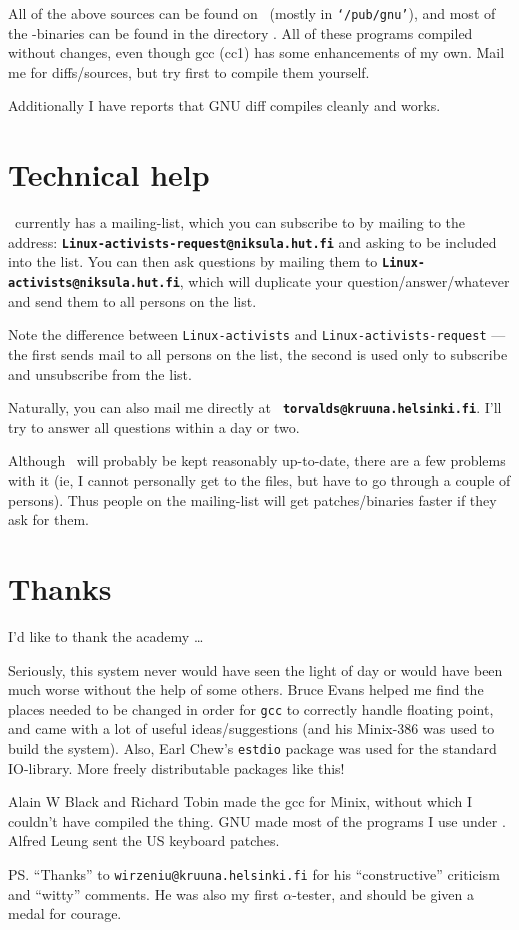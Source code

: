 All of the above sources can be found on \nic\ (mostly in
{\tt`/pub/gnu'}), and most of the \Linux-binaries can be found in the
directory \dir. All of these programs compiled without changes, even
though gcc (cc1) has some enhancements of my own. Mail me for
diffs/sources, but try first to compile them yourself.

Additionally I have reports that GNU diff compiles cleanly and works.

\section{Technical help}

\Linux\ currently has a mailing-list, which you can subscribe to by
mailing to the address: {\tt\bf Linux-activists-request@niksula.hut.fi}
and asking to be included into the list.  You can then ask questions by
mailing them to {\tt\bf Linux-activists@niksula.hut.fi}, which will
duplicate your question/answer/whatever and send them to all persons on
the list. 

Note the difference between {\tt Linux-activists} and
{\tt Linux-activists-request} --- the first sends mail to all persons on
the list, the second is used only to subscribe and unsubscribe from the
list.

Naturally, you can also mail me directly at {\tt\bf
torvalds@kruuna.helsinki.fi}.  I'll try to answer all questions within a
day or two.

Although \nic\ will probably be kept reasonably up-to-date, there are a
few problems with it (ie, I cannot personally get to the files, but have
to go through a couple of persons). Thus people on the mailing-list will
get patches/binaries faster if they ask for them.

\section{Thanks}

I'd like to thank the academy \dots

Seriously, this system never would have seen the light of day or would
have been much worse without the help of some others.  Bruce Evans
helped me find the places needed to be changed in order for {\tt gcc} to
correctly handle floating point, and came with a lot of useful
ideas/suggestions (and his Minix-386 was used to build the system). 
Also, Earl Chew's {\tt estdio} package was used for the standard
IO-library.  More freely distributable packages like this!

Alain W Black and Richard Tobin made the gcc for Minix, without which I
couldn't have compiled the thing.  GNU made most of the programs I use
under \Linux.  Alfred Leung sent the US keyboard patches. 

PS. ``Thanks'' to {\tt wirzeniu@kruuna.helsinki.fi} for his
``constructive'' criticism and ``witty'' comments. He was also my first
$\alpha$-tester, and should be given a medal for courage.


